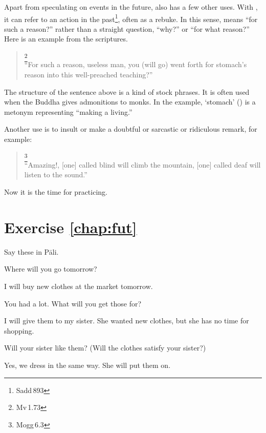 Apart from speculating on events in the future,  also has a few other uses. With , it can refer to an action in the past\footnote{Sadd\,893}, often as a rebuke. In this sense,  means ``for such a reason?'' rather than a straight question, ``why?'' or ``for what reason?'' Here is an example from the scriptures.

\begin{quote}
\footnote{Mv\,1.73}\\
``For such a reason, useless man, you (will go) went forth for stomach's reason into this well-preached teaching?''
\end{quote}

The structure of the sentence above is a kind of stock phrases. It is often used when the Buddha gives admonitions to monks. In the example, `stomach' () is a metonym representing ``making a living.''

Another use is to insult or make a doubtful or sarcastic or ridiculous remark, for example:

\begin{quote}
\footnote{Mogg\,6.3}\\
``Amazing!, [one] called blind will climb the mountain, [one] called deaf will listen to the sound.''
\end{quote}

Now it is the time for practicing.

\section*{Exercise \ref{chap:fut}}
Say these in P\=ali.
\begin{compactenum}
\item Where will you go tomorrow?
\item I will buy new clothes at the market tomorrow.
\item You had a lot. What will you get those for?
\item I will give them to my sister. She wanted new clothes, but she has no time for shopping.
\item Will your sister like them? (Will the clothes satisfy your sister?)
\item Yes, we dress in the same way. She will put them on.
\end{compactenum}
